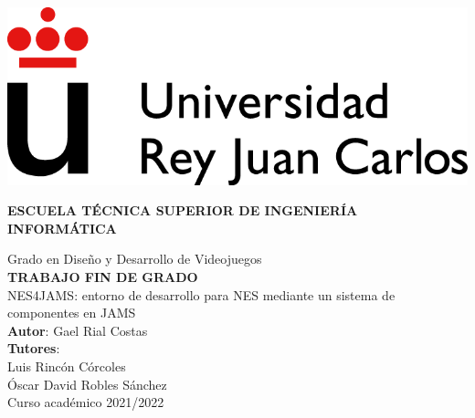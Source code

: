 \thispagestyle{empty}

\includegraphics{images/URJC_logo}
\vspace{2cm}

\begin{center}
	\large{\textbf{ESCUELA TÉCNICA SUPERIOR DE INGENIERÍA INFORMÁTICA}}
	\vspace{5mm}

 	{\Large {Grado en Diseño y Desarrollo de Videojuegos}}
    \\
  	\vspace{34mm}
	{\large {\bf TRABAJO FIN DE GRADO}}
  	\vspace{10mm}
    \\
  	{\Large {{\Huge {
		NES4JAMS: entorno de desarrollo para NES mediante un sistema de componentes en JAMS
	}} \\[1cm] }}
  	\vspace{2cm}
	{\large {
		\textbf{Autor}: Gael Rial Costas\\
		\textbf{Tutores}:\\
		Luis Rincón Córcoles\\
		Óscar David Robles Sánchez\\
	}}
	\vspace{10mm}
  	{\large {Curso académico 2021/2022}}
  	\vspace{1cm}
\end{center}
